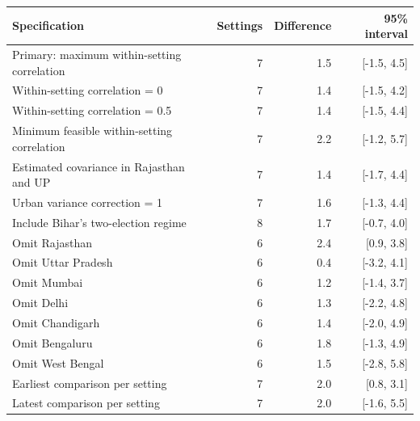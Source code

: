 \begin{tabular}{lrrr}
\toprule
Specification & Settings & Difference & 95\% interval \\
\midrule
Primary: maximum within-setting correlation & 7 & 1.5 & [-1.5, 4.5] \\
Within-setting correlation = 0 & 7 & 1.4 & [-1.5, 4.2] \\
Within-setting correlation = 0.5 & 7 & 1.4 & [-1.5, 4.4] \\
Minimum feasible within-setting correlation & 7 & 2.2 & [-1.2, 5.7] \\
Estimated covariance in Rajasthan and UP & 7 & 1.4 & [-1.7, 4.4] \\
Urban variance correction = 1 & 7 & 1.6 & [-1.3, 4.4] \\
Include Bihar's two-election regime & 8 & 1.7 & [-0.7, 4.0] \\
Omit Rajasthan & 6 & 2.4 & [0.9, 3.8] \\
Omit Uttar Pradesh & 6 & 0.4 & [-3.2, 4.1] \\
Omit Mumbai & 6 & 1.2 & [-1.4, 3.7] \\
Omit Delhi & 6 & 1.3 & [-2.2, 4.8] \\
Omit Chandigarh & 6 & 1.4 & [-2.0, 4.9] \\
Omit Bengaluru & 6 & 1.8 & [-1.3, 4.9] \\
Omit West Bengal & 6 & 1.5 & [-2.8, 5.8] \\
Earliest comparison per setting & 7 & 2.0 & [0.8, 3.1] \\
Latest comparison per setting & 7 & 2.0 & [-1.6, 5.5] \\
\bottomrule
\end{tabular}
